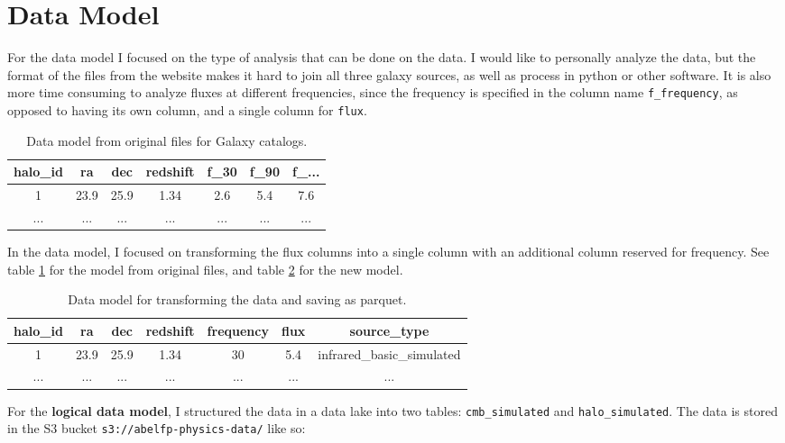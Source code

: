 \documentclass[12pt,letterpaper]{article}
\begin{document}
\section*{Data Model}
For the data model I focused on the type of analysis that can be done on the
data. I would like to personally analyze the data, but the format of the files
from the website makes it hard to join all three galaxy sources, as well as
process in python or other software. It is also more time consuming to
analyze fluxes at different frequencies, since the frequency is specified in
the column name \texttt{f\_frequency}, as opposed to having its own column, and
a single column for \texttt{flux}.

\begin{table}[h!]
    \centering
    \begin{tabular}{ |c|c|c|c|c|c|c| }
        \hline
        halo\_id & ra & dec & redshift & f\_30 & f\_90 & f\_... \\
        \hline
        1 & 23.9 & 25.9  & 1.34 & 2.6 & 5.4 & 7.6 \\ 
        ... & ... & ...  & ... & ... & ... & ... \\ 
        \hline
    \end{tabular}
    \caption{Data model from original files for Galaxy catalogs.}
    \label{table:galold}
\end{table}

In the data model, I focused on transforming the flux columns into a single
column with an additional column reserved for frequency. See table
\ref{table:galold} for the model from original files, and table
\ref{table:galnew} for the new model.

\begin{table}[h!]
    \centering
    \begin{tabular}{ |c|c|c|c|c|c|c| }
        \hline
        halo\_id & ra & dec & redshift & frequency & flux & source\_type \\
        \hline
        1 & 23.9 & 25.9  & 1.34 & 30 & 5.4 & infrared\_basic\_simulated \\ 
        ... & ... & ...  & ... & ... & ... & ... \\ 
        \hline
    \end{tabular}
    \caption{Data model for transforming the data and saving as parquet.}
    \label{table:galnew}
\end{table}

For the \textbf{logical data model}, I structured the data in a data lake into
two tables: \texttt{cmb\_simulated} and \texttt{halo\_simulated}. The data is
stored in the S3 bucket \texttt{s3://abelfp-physics-data/} like so:
\end{document}
